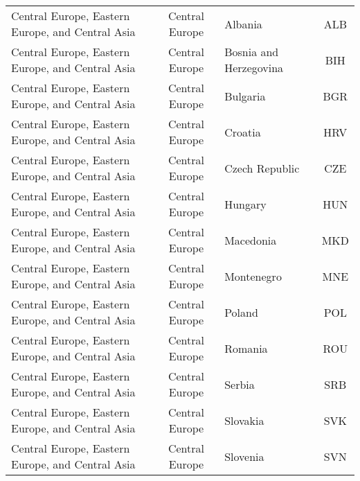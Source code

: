 \begin{landscape}
\begin{longtable}{|p{6cm}|c|p{5cm}|c|}
\raggedright Central Europe, Eastern Europe, and Central Asia &              \raggedright Central Europe &                                           Albania &  ALB \\
\raggedright Central Europe, Eastern Europe, and Central Asia &              \raggedright Central Europe &                            Bosnia and Herzegovina &  BIH \\
\raggedright Central Europe, Eastern Europe, and Central Asia &              \raggedright Central Europe &                                          Bulgaria &  BGR \\
\raggedright Central Europe, Eastern Europe, and Central Asia &              \raggedright Central Europe &                                           Croatia &  HRV \\
\raggedright Central Europe, Eastern Europe, and Central Asia &              \raggedright Central Europe &                                    Czech Republic &  CZE \\
\raggedright Central Europe, Eastern Europe, and Central Asia &              \raggedright Central Europe &                                           Hungary &  HUN \\
\raggedright Central Europe, Eastern Europe, and Central Asia &              \raggedright Central Europe &                                         Macedonia &  MKD \\
\raggedright Central Europe, Eastern Europe, and Central Asia &              \raggedright Central Europe &                                        Montenegro &  MNE \\
\raggedright Central Europe, Eastern Europe, and Central Asia &              \raggedright Central Europe &                                            Poland &  POL \\
\raggedright Central Europe, Eastern Europe, and Central Asia &              \raggedright Central Europe &                                           Romania &  ROU \\
\raggedright Central Europe, Eastern Europe, and Central Asia &              \raggedright Central Europe &                                            Serbia &  SRB \\
\raggedright Central Europe, Eastern Europe, and Central Asia &              \raggedright Central Europe &                                          Slovakia &  SVK \\
\raggedright Central Europe, Eastern Europe, and Central Asia &              \raggedright Central Europe &                                          Slovenia &  SVN \\

\end{longtable}
\end{landscape}
